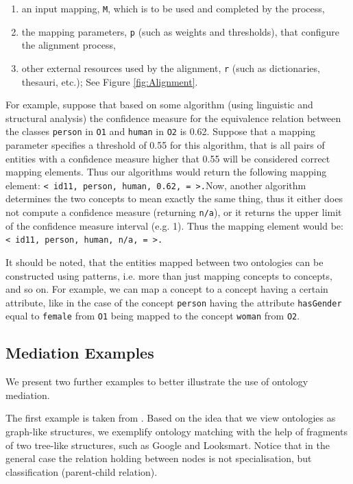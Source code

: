 \begin{enumerate}
\item an input mapping, \texttt{M}, which is to be used and
completed by the process, 
\item the mapping parameters, \texttt{p} (such as weights
and thresholds), that configure the alignment process, 
\item other external resources used by the alignment,
\texttt{r} (such as dictionaries, thesauri, etc.); See Figure \ref{fig:Alignment}. 
\end{enumerate}
For example, suppose that based on some algorithm (using linguistic and
structural analysis) the confidence measure for the equivalence
relation between the classes \texttt{person} in
\texttt{O1} and \texttt{human} in
\texttt{O2} is 0.62. Suppose that a mapping parameter
specifies a threshold of 0.55 for this algorithm, that is all pairs of
entities with a confidence measure higher that 0.55 will be considered
correct mapping elements. Thus our algorithms would return the
following mapping element: \texttt{{\textless} id11,
person, human, 0.62, = {\textgreater}.}Now, another algorithm
determines the two concepts to mean exactly the same thing, thus it
either does not compute a confidence measure (returning
\texttt{n/a}), or it returns the upper limit of the
confidence measure interval (e.g. 1). Thus the mapping element would
be: \texttt{{\textless} id11, person, human, n/a, =
{\textgreater}.} 

It should be noted, that the entities mapped between two ontologies can
be constructed using patterns, i.e. more than just mapping concepts to
concepts, and so on. For example, we can map a concept to a concept
having a certain attribute, like in the case of the concept
\texttt{person} having the attribute
\texttt{hasGender} equal to \texttt{female}
from \texttt{O1} being mapped to the concept
\texttt{woman} from \texttt{O2}. 

\subsection{Mediation Examples}
\label{subsec:mediationproblem_examples}
We present two further examples to better illustrate the use of ontology
mediation. 

The first example is taken from \cite{giunchiglia2008evaluation}. Based on the
idea that we view ontologies as graph-like structures, we exemplify
ontology matching with the help of fragments of two tree-like
structures, such as Google and Looksmart. Notice that in the general
case the relation holding between nodes is not specialisation, but
classification (parent-child relation). 

